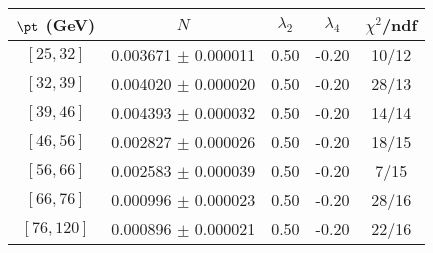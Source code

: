 \begin{tabular}{c||c|c|c|c}
$\pt$ (GeV) & $N$ & $\lambda_{2}$ & $\lambda_4$  & $\chi^2$/ndf  \\
\hline
$[25, 32]$ & 0.003671 $\pm$ 0.000011 & 0.50 & -0.20 & 10/12\\
$[32, 39]$ & 0.004020 $\pm$ 0.000020 & 0.50 & -0.20 & 28/13\\
$[39, 46]$ & 0.004393 $\pm$ 0.000032 & 0.50 & -0.20 & 14/14\\
$[46, 56]$ & 0.002827 $\pm$ 0.000026 & 0.50 & -0.20 & 18/15\\
$[56, 66]$ & 0.002583 $\pm$ 0.000039 & 0.50 & -0.20 & 7/15\\
$[66, 76]$ & 0.000996 $\pm$ 0.000023 & 0.50 & -0.20 & 28/16\\
$[76, 120]$ & 0.000896 $\pm$ 0.000021 & 0.50 & -0.20 & 22/16\\
\end{tabular}
